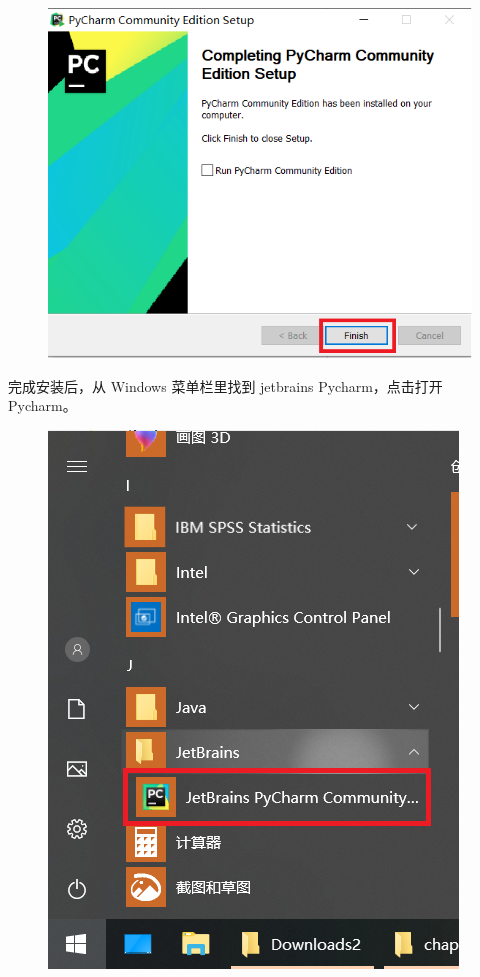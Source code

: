 \begin{figure}[!ht]
  \centering
  \includegraphics[scale=0.5]{figure/chapter1/pycharm8.png}
\end{figure}


完成安装后，从 Windows 菜单栏里找到 jetbrains Pycharm，点击打开 Pycharm。

\begin{figure}[!ht]
  \centering
  \includegraphics[scale=0.4]{figure/chapter1/pycharm9.png}
\end{figure}


